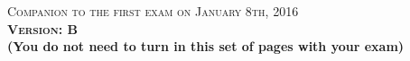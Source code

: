 \documentclass{docist}
\begin{document}
\thispagestyle{empty}

\begin{center}
  {\Large \textsc{Companion to the first exam on January 8th, 2016\\[2ex]
  \textbf{Version: B}\\[2ex]}}
  {\normalsize  \textbf{(You do not need to turn in this set of pages with your exam)}}
\end{center}




\qContinousIntegrationScenariosTacticsOne


\qInfinispanScenariosTacticsOne


\qWebTwoOne


\qMicroservicesArchitectureOne


\qAmazonOne


\qDesigningArchitectureOne


\qModuleViewtypeOne


\qUsesGeneralizationOne


\qLayeredAspectsDataModelOne


\qAvailabilityOne


\qModifiabilityOne


\qPerformanceOne


\qNginxScenariosTacticsOne


\qComponentConnectorOne


\qRepositoryClientServerOne

\end{document}
